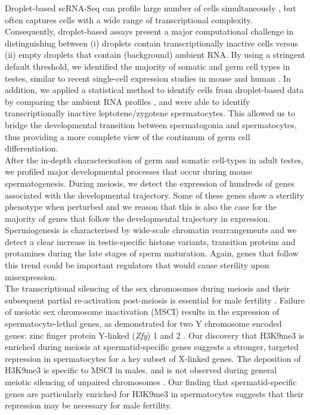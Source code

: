 Droplet-based scRNA-Seq can profile large number of cells simultaneously \citep{Klein2015, Macosko2015, Zheng2017}, but often captures cells with a wide range of transcriptional complexity. Consequently, droplet-based assays present a major computational challenge in distinguishing between (i) droplets contain transcriptionally inactive cells versus (ii) empty droplets that contain (background) ambient RNA. By using a stringent default threshold, we identified the majority of somatic and germ cell types in testes, similar to recent single-cell expression studies in mouse and human \citep{Lukassen2018, Xia2018, Chen2018}. In addition, we applied a statistical method to identify cells from droplet-based data by comparing the ambient RNA profiles \citep{Lun2018}, and were able to identify transcriptionally inactive leptotene/zygotene spermatocytes. This allowed us to bridge the developmental transition between spermatogonia and spermatocytes, thus providing a more complete view of the continuum of germ cell differentiation.\\

After the in-depth characterisation of germ and somatic cell-types in adult testes, we profiled major developmental processes that occur during mouse spermatogenesis. During meiosis, we detect the expression of hundreds of genes associated with the developmental trajectory. Some of these genes show a sterility phenotype when perturbed and we reason that this is also the case for the majority of genes that follow the developmental trajectory in expression. Spermiogenesis is characterised by wide-scale chromatin rearrangements and we detect a clear increase in testis-specific histone variants, transition proteins and protamines during the late stages of sperm maturation. Again, genes that follow this trend could be important regulators that would cause sterility upon misexpression.   \\

The transcriptional silencing of the sex chromosomes during meiosis and their subsequent partial re-activation post-meiosis is essential for male fertility \citep{Mahadevaiah2008}. Failure of meiotic sex chromosome inactivation (MSCI) results in the expression of spermatocyte-lethal genes, as demonstrated for two Y chromosome encoded genes: zinc finger protein Y-linked (\textit{Zfy}) 1 and 2 \citep{Royo2010}. Our discovery that H3K9me3 is enriched during meiosis at spermatid-specific genes suggests a stronger, targeted repression in spermatocytes for a key subset of X-linked genes. The deposition of H3K9me3 is specific to MSCI in males, and is not observed during general meiotic silencing of unpaired chromosomes \citep{Cloutier2016, Taketo2013, Turner2004a}. Our finding that spermatid-specific genes are particularly enriched for H3K9me3 in spermatocytes suggests that their repression may be necessary for male fertility. \\

